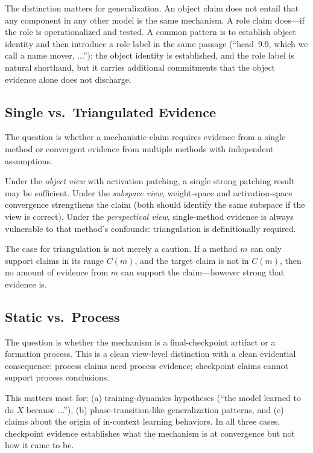 \documentclass{article}
\begin{document}
The distinction matters for generalization.  An object claim does not
entail that any component in any other model is the same mechanism.  A
role claim does---if the role is operationalized and tested.  A common pattern is to establish object identity and then introduce a
role label in the same passage (``head~9.9, which we call a name
mover, ...''): the object identity is established, and the role label
is natural shorthand, but it carries additional commitments that the
object evidence alone does not discharge.

\subsection{Single vs.\ Triangulated Evidence}

The question is whether a mechanistic claim requires evidence from a
single method or convergent evidence from multiple methods with
independent assumptions.

Under the \emph{object view} with activation patching, a single strong
patching result may be sufficient.  Under the \emph{subspace view},
weight-space and activation-space convergence strengthens the claim
(both should identify the same subspace if the view is correct).
Under the \emph{perspectival view}, single-method evidence is always
vulnerable to that method's confounds: triangulation is definitionally
required.

The case for triangulation is not merely a caution.  If a method $m$
can only support claims in its range $C(m)$, and the target claim is
not in $C(m)$, then no amount of evidence from $m$ can support the
claim---however strong that evidence is.

\subsection{Static vs.\ Process}

The question is whether the mechanism is a final-checkpoint artifact
or a formation process.  This is a clean view-level distinction with
a clean evidential consequence: process claims need process evidence;
checkpoint claims cannot support process conclusions.

This matters most for: (a) training-dynamics hypotheses (``the model
learned to do $X$ because ...''), (b) phase-transition-like generalization
patterns, and (c) claims about the origin of in-context learning
behaviors.  In all three cases, checkpoint evidence establishes what
the mechanism is at convergence but not how it came to be.
\end{document}
